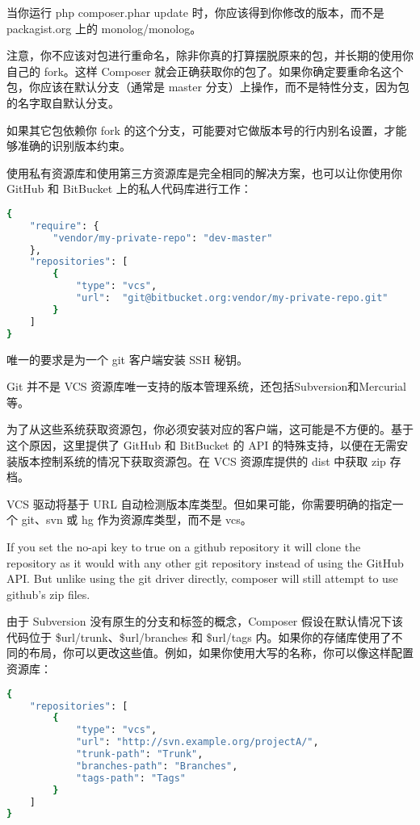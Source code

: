 当你运行 php composer.phar update 时，你应该得到你修改的版本，而不是 packagist.org 上的 monolog/monolog。

注意，你不应该对包进行重命名，除非你真的打算摆脱原来的包，并长期的使用你自己的 fork。这样 Composer 就会正确获取你的包了。如果你确定要重命名这个包，你应该在默认分支（通常是 master 分支）上操作，而不是特性分支，因为包的名字取自默认分支。

如果其它包依赖你 fork 的这个分支，可能要对它做版本号的行内别名设置，才能够准确的识别版本约束。

使用私有资源库和使用第三方资源库是完全相同的解决方案，也可以让你使用你 GitHub 和 BitBucket 上的私人代码库进行工作：



\begin{lstlisting}[language=bash]
{
    "require": {
        "vendor/my-private-repo": "dev-master"
    },
    "repositories": [
        {
            "type": "vcs",
            "url":  "git@bitbucket.org:vendor/my-private-repo.git"
        }
    ]
}
\end{lstlisting}

唯一的要求是为一个 git 客户端安装 SSH 秘钥。

Git 并不是 VCS 资源库唯一支持的版本管理系统，还包括Subversion和Mercurial等。

为了从这些系统获取资源包，你必须安装对应的客户端，这可能是不方便的。基于这个原因，这里提供了 GitHub 和 BitBucket 的 API 的特殊支持，以便在无需安装版本控制系统的情况下获取资源包。在 VCS 资源库提供的 dist 中获取 zip 存档。

VCS 驱动将基于 URL 自动检测版本库类型。但如果可能，你需要明确的指定一个 git、svn 或 hg 作为资源库类型，而不是 vcs。

If you set the no-api key to true on a github repository it will clone the repository as it would with any other git repository instead of using the GitHub API. But unlike using the git driver directly, composer will still attempt to use github's zip files.

由于 Subversion 没有原生的分支和标签的概念，Composer 假设在默认情况下该代码位于 \$url/trunk、\$url/branches 和 \$url/tags 内。如果你的存储库使用了不同的布局，你可以更改这些值。例如，如果你使用大写的名称，你可以像这样配置资源库：



\begin{lstlisting}[language=bash]
{
    "repositories": [
        {
            "type": "vcs",
            "url": "http://svn.example.org/projectA/",
            "trunk-path": "Trunk",
            "branches-path": "Branches",
            "tags-path": "Tags"
        }
    ]
}
\end{lstlisting}

